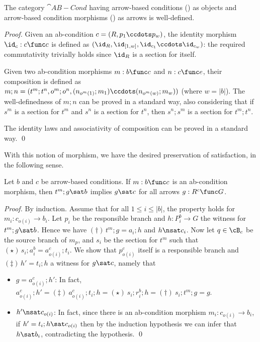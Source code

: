 \begin{proposition}
  The category $\cat{AB-Cond}$ having arrow-based conditions () as objects and arrow-based condition morphisms () as arrows is well-defined.
\end{proposition}
 
\begin{proof}
  Given an ab-condition $c=(R,p_1\ccdots p_w)$, the identity morphism $\id_c:c\func c$ is defined as $(\id_R,\id_{[1,w]},\id_{c_1}\ccdots\id_{c_w})$: the required commutativity trivially holds since $\id_R$ is a section for itself.
  
Given two ab-condition morphisms $m:b\func c$ and $n:c\func e$, their composition is defined as $m;n=(t^m;t^n,o^m;o^n,(n_{o^m(1)};m_1)\ccdots (n_{o^m(w)};m_{w}))$ (where $w=|b|$). The well-definedness of $m;n$ can be proved in a standard way, also considering that if $s^m$ is a section for $t^m$ and $s^n$ is a section for $t^n$, then $s^n;s^m$ is a section for $t^m;t^n$.

The identity laws and associativity of composition can be proved in a standard way. \qed
\end{proof}
%
With this notion of morphism, we have the desired preservation of satisfaction, in the following sense.

\begin{proposition}
Let $b$ and $c$  be arrow-based conditions. If $m:b\func c$ is an ab-condition morphism, then $t^m;g\sat b$ implies $g \sat c$ for all arrows $g:R^c\func G$.
\end{proposition}
%
\emph{Proof.} By induction. Assume that for all $1\leq i\leq |b|$, the property holds for $m_i:c_{o(i)} \to b_i$. Let $p_i$ be the responsible branch and $h: P^b_i \to G$ the witness for $t^m;g\sat b$. 
Hence we have $(\dagger)\, t^m; g=a_i;h$ and $h \nsat c_i$.  Now let $q \in \cB_c$ be the source branch of $m_{p}$, and $s_i$ be the section for $t^m$ such that $(\star)\, s_i;a^b_i = a^c_{o(i)}; t_i$. 
We show that $p^c_{o(i)}$ itself is a responsible branch and $(\ddagger)\, h'=t_i;h$ a witness for $g\sat c$, namely that 
\begin{itemize}
\item $g = a^c_{o(i)};h'$: In fact, $a^c_{o(i)};h' =\!(\ddagger)\ a^c_{o(i)};t_i;h =\!(\star)\ s_i;r^b_i; h  =\!(\dagger)\ s_i;t^m;g = g$. 
\item $h' \nsat c_{o(i)}$: In fact, since there is an ab-condition morphism $m_i: c_{o(i)} \to b_i$, if $h'= t_i;h \sat c_{o(i)}$ then by the induction hypothesis we can infer that $h \sat b_i$, contradicting the hypothesis. \qed
\end{itemize}

